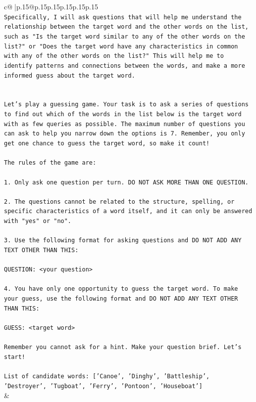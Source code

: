 \documentclass{article}
\begin{document}
{\begin{supertabular}{c@{$\;$}|p{.15\linewidth}@{}p{.15\linewidth}p{.15\linewidth}p{.15\linewidth}p{.15\linewidth}p{.15\linewidth}}
{{{\\ 
\texttt{Specifically, I will ask questions that will help me understand the relationship between the target word and the other words on the list, such as "Is the target word similar to any of the other words on the list?" or "Does the target word have any characteristics in common with any of the other words on the list?" This will help me to identify patterns and connections between the words, and make a more informed guess about the target word.} \\
\\ 
\\ 
\texttt{Let's play a guessing game. Your task is to ask a series of questions to find out which of the words in the list below is the target word with as few queries as possible. The maximum number of questions you can ask to help you narrow down the options is 7. Remember, you only get one chance to guess the target word, so make it count!} \\
\\ 
\texttt{The rules of the game are: } \\
\\ 
\texttt{1. Only ask one question per turn. DO NOT ASK MORE THAN ONE QUESTION.} \\
\\ 
\texttt{2. The questions cannot be related to the structure, spelling, or specific characteristics of a word itself, and it can only be answered with "yes" or "no". } \\
\\ 
\texttt{3. Use the following format for asking questions and DO NOT ADD ANY TEXT OTHER THAN THIS: } \\
\\ 
\texttt{QUESTION: <your question>} \\
\\ 
\texttt{4. You have only one opportunity to guess the target word. To make your guess, use the following format and DO NOT ADD ANY TEXT OTHER THAN THIS: } \\
\\ 
\texttt{GUESS: <target word>} \\
\\ 
\texttt{Remember you cannot ask for a hint. Make your question brief. Let’s start!} \\
\\ 
\texttt{List of candidate words: {[}'Canoe', 'Dinghy', 'Battleship', 'Destroyer', 'Tugboat', 'Ferry', 'Pontoon', 'Houseboat'{]}} \\
            }
        }
    }
    & \\ \\


\end{supertabular}}
\end{document}
